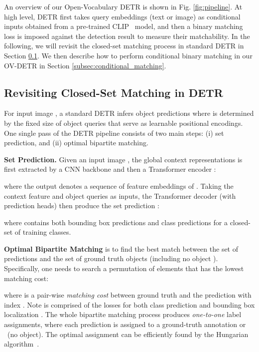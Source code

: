 \documentclass[runningheads]{llncs}
\begin{document}
An overview of our Open-Vocabulary DETR is shown in Fig. \ref{fig:pipeline}. At high level, DETR first takes query embeddings (text or image) as conditional inputs obtained from a pre-trained CLIP~\cite{radford2021learning} model, and then a binary matching loss is imposed against the detection result to measure their matchability. In the following, we will revisit the closed-set matching process in standard DETR in Section \ref{subsec:revist_matching}. We then describe how to perform conditional binary matching in our OV-DETR in Section \ref{subsec:conditional_matching}.

\subsection{Revisiting Closed-Set Matching in DETR}
\label{subsec:revist_matching}
For input image , a standard DETR infers  object predictions  where  is determined by the fixed size of object queries  that serve as learnable positional encodings. One single pass of the DETR pipeline consists of two main steps: (i) set prediction, and (ii) optimal bipartite matching.

\noindent \textbf{Set Prediction.} Given an input image , the global context representations  is first extracted by a CNN backbone  and then a Transformer encoder :

where the output  denotes a sequence of feature embeddings of . Taking the context feature  and object queries  as inputs,
the Transformer decoder  (with prediction heads) then produce the set prediction  :

where  contains both bounding box predictions  and class predictions  for a closed-set of training classes.

\noindent \textbf{Optimal Bipartite Matching} is to find the best match between the set of  predictions  and the set of ground truth objects  (including no object ). Specifically, one needs to search a permutation of  elements  that has the lowest matching cost: 

where  is a pair-wise \textit{matching cost} between ground truth  and the prediction  with index . Note  is comprised of the losses for both class prediction  and bounding box localization . The whole bipartite matching process produces \textit{one-to-one} label assignments, where each prediction  is assigned to a ground-truth annotation  or ~(no object). The optimal assignment can be efficiently found by the Hungarian algorithm~\cite{kuhn1955hungarian}.
\end{document}
